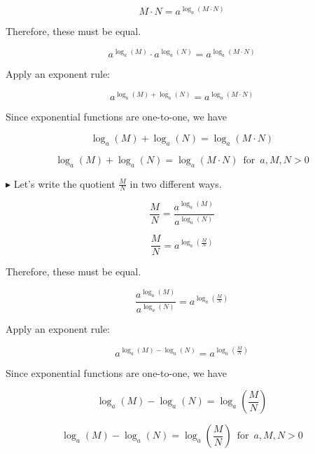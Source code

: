 \documentclass{ximera}
\begin{document}
\[   M \cdot N = a^{\log_a(M \cdot N)}                  \]


Therefore, these must be equal.


\[    a^{\log_a(M)} \cdot a^{\log_a(N)}     =   a^{\log_a(M \cdot N)}                \]


Apply an exponent rule:


\[    a^{\log_a(M)+\log_a(N)}    =   a^{\log_a(M \cdot N)}                \]



Since exponential functions are one-to-one, we have 


\[    \log_a(M)+\log_a(N)    =   \log_a(M \cdot N)               \]




\begin{template} 

\[    \log_a(M)+\log_a(N)    =   \log_a(M \cdot N)      \, \text{ for } \, a, M, N > 0        \]


\end{template}




$\blacktriangleright$  Let's write the quotient $\frac{M}{N}$ in two different ways.



\[   \frac{M}{N} = \frac{a^{\log_a(M)}}{a^{\log_a(N)}}                    \]

\[   \frac{M}{N} = a^{\log_a\left(\frac{M}{N}\right)}                  \]


Therefore, these must be equal.


\[    \frac{a^{\log_a(M)}}{a^{\log_a(N)}}    =   a^{\log_a\left(\frac{M}{N}\right)}                \]


Apply an exponent rule:


\[    a^{\log_a(M) - \log_a(N)}    =   a^{\log_a\left(\frac{M}{N}\right)}                \]



Since exponential functions are one-to-one, we have 


\[    \log_a(M)-\log_a(N)    =   \log_a\left(\frac{M}{N}\right)             \]








\begin{template} 

\[    \log_a(M)-\log_a(N)    =   \log_a\left(\frac{M}{N}\right)        \, \text{ for } \, a, M, N > 0        \]


\end{template}
\end{document}
